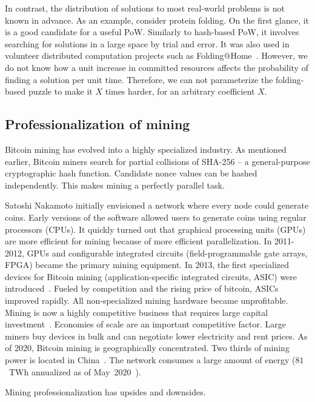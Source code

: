 In contrast, the distribution of solutions to most real-world problems is not known in advance.
As an example, consider protein folding.
On the first glance, it is a good candidate for a useful PoW.
Similarly to hash-based PoW, it involves searching for solutions in a large space by trial and error.
It was also used in volunteer distributed computation projects such as Folding@Home~\cite{Beberg2009}.
However, we do not know how a unit increase in committed resources affects the probability of finding a solution per unit time.
Therefore, we can not parameterize the folding-based puzzle to make it $X$ times harder, for an arbitrary coefficient $X$.



\subsection{Professionalization of mining}

Bitcoin mining has evolved into a highly specialized industry.
As mentioned earlier, Bitcoin miners search for partial collisions of SHA-256 -- a general-purpose cryptographic hash function.
Candidate nonce values can be hashed independently.
This makes mining a perfectly parallel task.

Satoshi Nakamoto initially envisioned a network where every node could generate coins.
Early versions of the software allowed users to generate coins using regular processors (CPUs).
It quickly turned out that graphical processing units (GPUs) are more efficient for mining because of more efficient parallelization.
In 2011-2012, GPUs and configurable integrated circuits (field-programmable gate arrays, FPGA) became the primary mining equipment.
In 2013, the first specialized devices for Bitcoin mining (application-specific integrated circuits, ASIC) were introduced~\cite{Kim2020}.
Fueled by competition and the rising price of bitcoin, ASICs improved rapidly.
All non-specialized mining hardware became unprofitable.
Mining is now a highly competitive business that requires large capital investment~\cite{Kroll2013}.
Economies of scale are an important competitive factor.
Large miners buy devices in bulk and can negotiate lower electricity and rent prices.
As of 2020, Bitcoin mining is geographically concentrated.
Two thirds of mining power is located in China~\cite{Rauchs2020}.
The network consumes a large amount of energy ($81$~TWh annualized as of May~2020~\cite{Rauchs2020}).

Mining professionalization has upsides and downsides.

